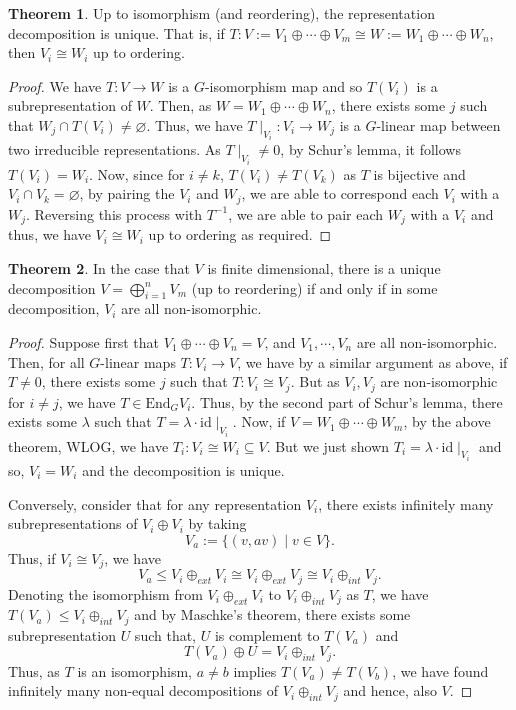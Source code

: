 \documentclass[]{article}
\theoremstyle{definition}
\newtheorem{theorem}{Theorem}
\theoremstyle{definition}
\begin{document}
\begin{theorem}
  Up to isomorphism (and reordering), the representation decomposition is unique.
  That is, if \(T : V := V_1 \oplus \cdots \oplus V_m \cong 
    W := W_1 \oplus \cdots \oplus W_n\), 
  then \(V_i \cong W_i\) up to ordering.
\end{theorem}
\begin{proof}
  We have \(T : V \to W\) is a \(G\)-isomorphism map and so \(T(V_i)\) is a 
  subrepresentation of \(W\). Then, as \(W = W_1 \oplus \cdots \oplus W_n\), 
  there exists some \(j\) such that \(W_j \cap T(V_i) \neq \varnothing\). Thus, 
  we have \(T\mid_{V_i} : V_i \to W_j\) is a \(G\)-linear map between two 
  irreducible representations. As \(T\mid_{V_i} \neq 0\), by Schur's lemma, it 
  follows \(T(V_i) = W_i\). Now, since for \(i \neq k\), \(T(V_i) \neq T(V_k)\) 
  as \(T\) is bijective and \(V_i \cap V_k = \varnothing\), by pairing the 
  \(V_i\) and \(W_j\), we are able to correspond each \(V_i\) with a \(W_j\). 
  Reversing this process with \(T^{-1}\), we are able to pair each \(W_j\) with
  a \(V_i\) and thus, we have \(V_i \cong W_i\) up to ordering as required.
\end{proof}

\begin{theorem}
  In the case that \(V\) is finite dimensional, there is a unique decomposition 
  \(V = \bigoplus_{i = 1}^n V_m\) (up to reordering) if and only if in some 
  decomposition, \(V_i\) are all non-isomorphic.
\end{theorem}
\begin{proof}
  Suppose first that \(V_1 \oplus \cdots \oplus V_n = V\), 
  and \(V_1, \cdots, V_n\) are all non-isomorphic. Then, for all \(G\)-linear maps
  \(T : V_i \to V\), we have by a similar argument as above, if \(T \neq 0\), 
  there exists some \(j\) such that \(T : V_i \cong V_j\). But as \(V_i, V_j\) 
  are non-isomorphic for \(i \neq j\), we have \(T \in \text{End}_G V_i\). Thus, 
  by the second part of Schur's lemma, there exists some \(\lambda\) such that 
  \(T = \lambda \cdot \text{id}\mid_{V_i}\). Now, if 
  \(V = W_1 \oplus \cdots \oplus W_m\), by the above theorem, WLOG, we have 
  \(T_i : V_i \cong W_i \subseteq V\). But we just shown 
  \(T_i = \lambda \cdot \text{id}\mid_{V_i}\) and so, \(V_i = W_i\) and the 
  decomposition is unique.

  Conversely, consider that for any representation \(V_i\), there exists infinitely
  many subrepresentations of \(V_i \oplus V_i\) by taking 
  \[V_a := \{(v, av) \mid v \in V\}.\]
  Thus, if \(V_i \cong V_j\), we have
  \[V_a \le V_i \oplus_{ext} V_i \cong V_i \oplus_{ext} V_j \cong V_i \oplus_{int} V_j.\]
  Denoting the isomorphism from \(V_i \oplus_{ext} V_i\) to \(V_i \oplus_{int} V_j\) 
  as \(T\), we have \(T(V_a) \le V_i \oplus_{int} V_j\) and by Maschke's theorem, 
  there exists some subrepresentation \(U\) such that, \(U\) is complement to 
  \(T(V_a)\) and
  \[T(V_a) \oplus U = V_i \oplus_{int} V_j.\]
  Thus, as \(T\) is an isomorphism, \(a \neq b\) implies \(T(V_a) \neq T(V_b)\), 
  we have found infinitely many non-equal decompositions of \(V_i \oplus_{int} V_j\) 
  and hence, also \(V\).
\end{proof}
\end{document}
